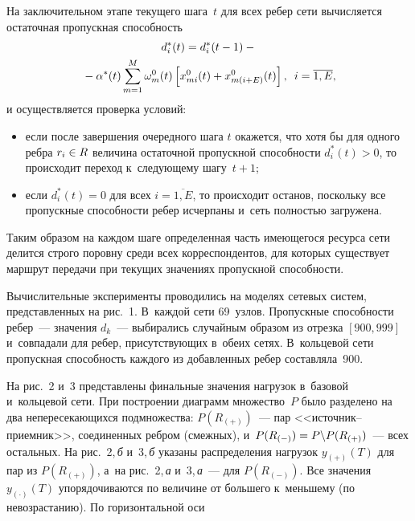 \begin{multicols}{2}
На заключительном этапе текущего шага~$t$ для всех ребер сети вычисляется 
остаточная пропускная способность
\begin{multline*} 
d_i^*(t) =
d_i^*(t-1) - {}\\
{}-\alpha^*(t) \sum\limits_{m=1}^{M} \omega_m^0(t) 
\left[x_{mi}^0(t) + x_{m(i+E)}^0(t)\right],\enskip  i = \overline{1, E},
\end{multline*}
и осуществляется проверка условий:
\begin{itemize}
\item если после завершения очередного шага $t$ окажется, что хотя бы для 
одного ребра $r_i \hm\in R$ величина остаточной пропускной способности 
$d_i^{*}(t) > 0$, то происходит переход к~следующему шагу~$t+1$;
\item
 если $d_i^{*}(t) = 0$ для всех  $i = \overline{1, E}$, то происходит 
останов, поскольку все пропускные способности ребер исчерпаны и~сеть 
полностью загружена.
\end{itemize}
Таким образом на каждом шаге определенная часть имеющегося ресурса сети 
делится строго поровну среди всех корреспондентов, для которых существует 
маршрут передачи при текущих значениях пропускной способности.

Вычислительные эксперименты проводились на моделях сетевых сис\-тем, 
пред\-став\-лен\-ных на рис.~1. 
В~каж\-дой сети 69~узлов. Пропускные способности ребер~--- значения $d_k$~--- 
выбирались случайным образом из отрезка $[900, 999]$ и~совпадали для ребер, 
при\-сут\-ст\-ву\-ющих в~обеих сетях. В~кольцевой сети пропускная спо\-соб\-ность каж\-до\-го 
из добавленных ребер со\-став\-ля\-ла~900.







На рис.~2 и~3 представлены финальные значения нагрузок в~базовой и~кольцевой 
сети. При построении диаграмм множество~$P$ было разделено на два 
непересекающихся подмножества: $P(R_{(+)})$~--- пар <<ис\-точ\-ник--при\-ем\-ник>>, 
соединенных ребром (смежных), и~$P(R_{(-)}) \hm= P \backslash 
P(R_{(+)})$~--- всех остальных. На рис.~2,\,\textit{б} и~3,\,\textit{б}
указаны распределения 
нагрузок $y_{(+)}(T)$ для пар из $P(R_{(+)})$, а~на рис.~2,\,\textit{а} и~3,\,\textit{а}~--- для 
$P(R_{(-)})$.
Все значения~$y_{(\cdot)}(T)$ упорядочиваются по величине от большего 
к~меньшему (по невозрастанию).  По горизонтальной оси\linebreak\vspace*{-12pt}


\end{multicols}
